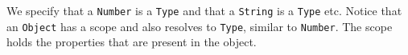 \documentclass{article}
\newcommand{\ttt}[1]{\texttt{#1}}
\begin{document}
\begin{center}
    \begin{minipage}{.35\textwidth}
    
    \end{minipage}
\end{center}

We specify that a \ttt{Number} is a \ttt{Type} and that a \ttt{String} is a \ttt{Type} etc.
Notice that an \ttt{Object} has a scope and also resolves to \ttt{Type}, similar to \ttt{Number}.
The scope holds the properties that are present in the object.



\end{document}
